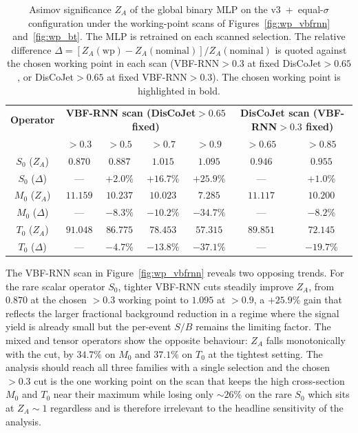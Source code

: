 \begin{table}[htbp]
  \centering
  \caption{Asimov significance $Z_A$ of the global binary MLP on the v3~+~equal-$\sigma$ configuration under the working-point scans of Figures~\ref{fig:wp_vbfrnn} and~\ref{fig:wp_bt}. The MLP is retrained on each scanned selection. The relative difference $\Delta = [Z_A(\text{wp}) - Z_A(\text{nominal})]/Z_A(\text{nominal})$ is quoted against the chosen working point in each scan (VBF-RNN${}>0.3$ at fixed DisCoJet${}>0.65$, or DisCoJet${}>0.65$ at fixed VBF-RNN${}>0.3$). The chosen working point is highlighted in bold.}
  \label{tab:wp_scan}
  \begin{tabular}{|c|c|c|c|c|c|c|}
    \hline
    \textbf{Operator} & \multicolumn{4}{c|}{\textbf{VBF-RNN scan (DisCoJet${}>0.65$ fixed)}} & \multicolumn{2}{c|}{\textbf{DisCoJet scan (VBF-RNN${}>0.3$ fixed)}} \\
                       & ${>}0.3$ & ${>}0.5$ & ${>}0.7$ & ${>}0.9$ & ${>}0.65$ & ${>}0.85$ \\
    \hline
    $S_0$ ($Z_A$)      & $\mathbf{0.870}$    & $0.887$   & $1.015$   & $1.095$   & $\mathbf{0.946}$   & $0.955$   \\
    $S_0$ ($\Delta$)   & ---                  & $+2.0\%$  & $+16.7\%$ & $+25.9\%$ & ---                 & $+1.0\%$  \\
    \hline
    $M_0$ ($Z_A$)      & $\mathbf{11.159}$   & $10.237$  & $10.023$  & $7.285$   & $\mathbf{11.117}$  & $10.200$  \\
    $M_0$ ($\Delta$)   & ---                  & $-8.3\%$  & $-10.2\%$ & $-34.7\%$ & ---                 & $-8.2\%$  \\
    \hline
    $T_0$ ($Z_A$)      & $\mathbf{91.048}$   & $86.775$  & $78.453$  & $57.315$  & $\mathbf{89.851}$  & $72.145$  \\
    $T_0$ ($\Delta$)   & ---                  & $-4.7\%$  & $-13.8\%$ & $-37.1\%$ & ---                 & $-19.7\%$ \\
    \hline
  \end{tabular}
\end{table}

The VBF-RNN scan in Figure~\ref{fig:wp_vbfrnn} reveals two opposing trends. For the rare scalar operator $S_0$, tighter VBF-RNN cuts steadily improve $Z_A$, from $0.870$ at the chosen ${>}0.3$ working point to $1.095$ at ${>}0.9$, a $+25.9\%$ gain that reflects the larger fractional background reduction in a regime where the signal yield is already small but the per-event $S/B$ remains the limiting factor. The mixed and tensor operators show the opposite behaviour: $Z_A$ falls monotonically with the cut, by $34.7\%$ on $M_0$ and $37.1\%$ on $T_0$ at the tightest setting. The analysis should reach all three families with a single selection and the chosen ${>}0.3$ cut is the one working point on the scan that keeps the high cross-section $M_0$ and $T_0$ near their maximum while losing only $\sim 26\%$ on the rare $S_0$ which sits at $Z_A\sim 1$ regardless and is therefore irrelevant to the headline sensitivity of the analysis.

